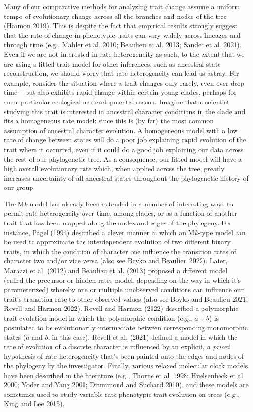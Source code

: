 \documentclass[fleqn,10pt,lineno]{wlpeerj} %
\begin{document}
Many of our comparative methods for analyzing trait change assume a uniform tempo of evolutionary change across all the branches and nodes of the tree (Harmon 2019). This is despite the fact that empirical results strongly suggest that the rate of change in phenotypic traits can vary widely across lineages and through time (e.g., Mahler et al. 2010; Beaulieu et al. 2013; Sander et al. 2021). Even if we are not interested in rate heterogeneity as such, to the extent that we are using a fitted trait model for other inferences, such as ancestral state reconstruction, we should worry that rate heterogeneity can lead us astray. For example, consider the situation where a trait changes only rarely, even over deep time -- but also exhibits rapid change within certain young clades, perhaps for some particular ecological or developmental reason. Imagine that a scientist studying this trait is interested in ancestral character conditions in the clade and fits a homogeneous rate model: since this is (by far) the most common assumption of ancestral character evolution. A homogeneous model with a low rate of change between states will do a poor job explaining rapid evolution of the trait where it occurred, even if it could do a good job explaining our data across the rest of our phylogenetic tree. As a consequence, our fitted model will have a high overall evolutionary rate which, when applied across the tree, greatly increases uncertainty of all ancestral states throughout the phylogenetic history of our group.

The M\emph{k} model has already been extended in a number of interesting ways to permit rate heterogeneity over time, among clades, or as a function of another trait that has been mapped along the nodes and edges of the phylogeny. For instance, Pagel (1994) described a clever manner in which an M\emph{k}-type model can be used to approximate the interdependent evolution of two different binary traits, in which the condition of character one influence the transition rates of character two and/or vice versa (also see Boyko and Beaulieu 2022). Later, Marazzi et al. (2012) and Beaulieu et al. (2013) proposed a different model (called the precursor or hidden-rates model, depending on the way in which it's parameterized) whereby one or multiple unobserved conditions can influence our trait's transition rate to other observed values (also see Boyko and Beaulieu 2021; Revell and Harmon 2022). Revell and Harmon (2022) described a polymorphic trait evolution model in which the polymorphic condition (e.g., \(a + b\)) is postulated to be evolutionarily intermediate between corresponding monomorphic states (\(a\) and \(b\), in this case). Revell et al. (2021) defined a model in which the rate of evolution of a discrete character is influenced by an explicit, \emph{a priori} hypothesis of rate heterogeneity that's been painted onto the edges and nodes of the phylogeny by the investigator. Finally, various relaxed molecular clock models have been described in the literature (e.g., Thorne et al. 1998; Huelsenbeck et al. 2000; Yoder and Yang 2000; Drummond and Suchard 2010), and these models are sometimes used to study variable-rate phenotypic trait evolution on trees (e.g., King and Lee 2015).
\end{document}
